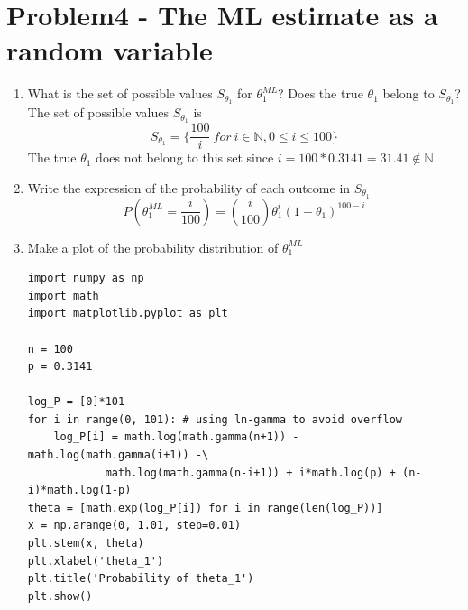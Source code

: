 \documentclass[preprint,12pt]{elsarticle}
\begin{document}
    \section{Problem4 - The ML estimate as a random variable}
    \begin{enumerate}
    \item What is the set of possible values $S_{\theta_1}$ for $\theta_1^{ML}$?
    Does the true $\theta_1$ belong to $S_{\theta_1}$?\\
    
    The set of possible values $S_{\theta_1}$ is 
    \begin{equation*}
        S_{\theta_1} = \{\frac{100}{i} \ for\ i\in \mathbb{N}, 0\leq i\leq 100\}
    \end{equation*}
    The true $\theta_1$ does not belong to this set since 
    $i=100*0.3141=31.41 \not\in \mathbb{N}$

    \item Write the expression of the probability of each outcome in $S_{\theta_1}$ \\
    \begin{equation*}
        P(\theta_1^{ML}=\frac{i}{100}) = \binom{i}{100}\theta_1^i (1-\theta_1)^{100-i}
    \end{equation*}

    \item Make a plot of the probability distribution of $\theta_1^{ML}$
    \begin{lstlisting}
import numpy as np
import math
import matplotlib.pyplot as plt

n = 100
p = 0.3141

log_P = [0]*101
for i in range(0, 101): # using ln-gamma to avoid overflow
    log_P[i] = math.log(math.gamma(n+1)) - math.log(math.gamma(i+1)) -\
            math.log(math.gamma(n-i+1)) + i*math.log(p) + (n-i)*math.log(1-p)
theta = [math.exp(log_P[i]) for i in range(len(log_P))]
x = np.arange(0, 1.01, step=0.01)
plt.stem(x, theta)
plt.xlabel('theta_1')
plt.title('Probability of theta_1')
plt.show()


\end{lstlisting}
\end{enumerate}
\end{document}
